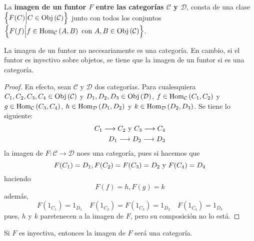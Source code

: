 \documentclass[12pt]{report}
\newcounter{it}
\theoremstyle{largebreak}
\newcommand\cf[3]{\ensuremath{#1:#2\rightarrow#3}}
\newcommand{\Obj}[1]{\ensuremath{\textup{Obj}\left(#1\right)}}
\newcommand{\Hom}[3]{\ensuremath{\textup{Hom}_{#1}\left(#2,#3\right)}}
\begin{document}
    \begin{mydef}
        La \textbf{imagen de un funtor $F$ entre las categorías $\mathcal{C}$ y $\mathcal{D}$}, consta de una clase $\left\{F(C)\Big|C\in\Obj{\mathcal{C}} \right\}$ junto con todos los conjuntos $\left\{F(f)\Big|f\in\Hom{\mathcal{C}}{A}{B}\textup{ con }A,B\in\Obj{\mathcal{C}} \right\}$.
    \end{mydef}

    \begin{obs}
        La imagen de un funtor no necesariamente es una categoría. En cambio, si el funtor es inyectivo sobre objetos, se tiene que la imagen de un funtor si es una categoría.
    \end{obs}

    \begin{proof}
        En efecto, sean $\mathcal{C}$ y $\mathcal{D}$ dos categorías. Para cualesquiera $C_1,C_2,C_3,C_4\in\Obj{\mathcal{C}}$ y $D_1,D_2,D_3\in\Obj{\mathcal{D}}$, $f\in\Hom{\mathcal{C}}{C_1}{C_2}$ y $g\in\Hom{\mathcal{C}}{C_3}{C_4}$, $h\in\Hom{\mathcal{D}}{D_1}{D_2}$ y $k\in\Hom{\mathcal{D}}{D_2}{D_3}$. Se tiene lo siguiente:
        \begin{equation*}
            \begin{split}
                C_1\longrightarrow C_2\textup{ y }C_3\longrightarrow C_4\\
                D_1\longrightarrow D_2\longrightarrow D_3\\
            \end{split}
        \end{equation*}
        la imagen de $\cf{F}{\mathcal{C}}{\mathcal{D}}$ noes una categoría, pues si hacemos que
        \begin{equation*}
            F(C_1)=D_1, F(C_2)=F(C_3)=D_2\textup{ y }F(C_4)=D_4
        \end{equation*}
        haciendo
        \begin{equation*}
            F(f)=h,F(g)=k
        \end{equation*}
        además,
        \begin{equation*}
            F(1_{C_1})=1_{D_1}\quad F(1_{C_2})=F(1_{C_3})=1_{D_2}\quad F(1_{C_4})=1_{D_3} 
        \end{equation*}
        pues, $h$ y $k$ paretenecen a la imagen de $F$, pero su composición no lo está.
    \end{proof}

    \begin{obs}
        Si $F$ es inyectiva, entonces la imagen de $F$ será una categoría.
    \end{obs}
\end{document}
